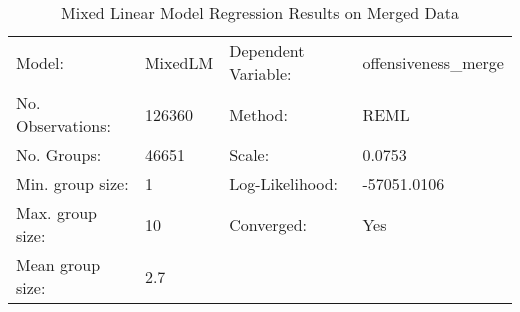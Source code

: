 \begin{table}
\caption{Mixed Linear Model Regression Results on Merged Data}
\label{}
\begin{center}
\begin{tabular}{llll}
\hline
Model:            & MixedLM & Dependent Variable: & offensiveness\_merge  \\
No. Observations: & 126360  & Method:             & REML                  \\
No. Groups:       & 46651   & Scale:              & 0.0753                \\
Min. group size:  & 1       & Log-Likelihood:     & -57051.0106           \\
Max. group size:  & 10      & Converged:          & Yes                   \\
Mean group size:  & 2.7     &                     &                       \\
\hline
\end{tabular}
\end{center}


\end{table}
